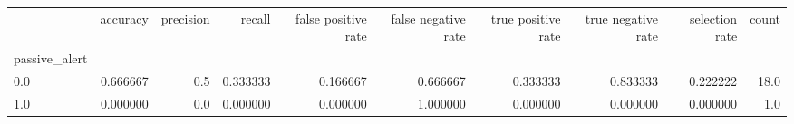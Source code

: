 \begin{tabular}{lrrrrrrrrr}
\toprule
{} &  accuracy &  precision &    recall &  false positive rate &  false negative rate &  true positive rate &  true negative rate &  selection rate &  count \\
passive\_alert &           &            &           &                      &                      &                     &                     &                 &        \\
\midrule
0.0           &  0.666667 &        0.5 &  0.333333 &             0.166667 &             0.666667 &            0.333333 &            0.833333 &        0.222222 &   18.0 \\
1.0           &  0.000000 &        0.0 &  0.000000 &             0.000000 &             1.000000 &            0.000000 &            0.000000 &        0.000000 &    1.0 \\
\bottomrule
\end{tabular}
